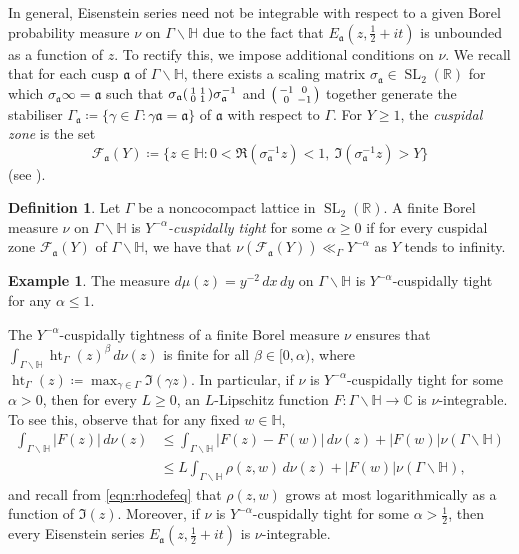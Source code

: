 \documentclass[11pt,a4paper]{amsart}
\newcommand{\af}{\mathfrak{a}}
\newcommand{\C}{\mathbb{C}}
\newcommand{\FF}{\mathcal{F}}
\newcommand{\Hb}{\mathbb{H}}
\newcommand{\R}{\mathbb{R}}
\DeclareMathOperator{\Ht}{ht}
\DeclareMathOperator{\SL}{SL}
\numberwithin{equation}{section}
\theoremstyle{remark}
\theoremstyle{definition}
\newtheorem{definition}[equation]{Definition}
\newtheorem{example}[equation]{Example}
\begin{document}
In general, Eisenstein series need not be integrable with respect to a given Borel probability measure $\nu$ on $\Gamma \backslash \Hb$ due to the fact that $E_{\af}(z,\frac{1}{2} + it)$ is unbounded as a function of $z$. To rectify this, we impose additional conditions on $\nu$. We recall that for each cusp $\af$ of $\Gamma \backslash \Hb$, there exists a scaling matrix $\sigma_{\af} \in \SL_2(\R)$ for which $\sigma_{\af} \infty = \af$ such that $\sigma_{\af} \begin{psmallmatrix} 1 & 1 \\ 0 & 1 \end{psmallmatrix} \sigma_{\af}^{-1}$ and $\begin{psmallmatrix} -1 & 0 \\ 0 & -1 \end{psmallmatrix}$ together generate the stabiliser $\Gamma_{\af} \coloneqq \{\gamma \in \Gamma : \gamma \af = \af\}$ of $\af$ with respect to $\Gamma$. For $Y \geq 1$, the \emph{cuspidal zone} is the set
\[\FF_{\af}(Y) \coloneqq \{z \in \Hb : 0 < \Re(\sigma_{\af}^{-1} z) < 1, \ \Im(\sigma_{\af}^{-1} z) > Y\}\]
(see \cite[Section 2.2]{Iwa02}).

\begin{definition}
Let $\Gamma$ be a noncocompact lattice in $\SL_2(\R)$. A finite Borel measure $\nu$ on $\Gamma \backslash \Hb$ is \emph{$Y^{-\alpha}$-cuspidally tight} for some $\alpha \geq 0$ if for every cuspidal zone $\FF_{\af}(Y)$ of $\Gamma \backslash \Hb$, we have that $\nu(\FF_{\af}(Y)) \ll_{\Gamma} Y^{-\alpha}$ as $Y$ tends to infinity.
\end{definition}

\begin{example}
The measure $d\mu(z) = y^{-2} \, dx \, dy$ on $\Gamma \backslash \Hb$ is $Y^{-\alpha}$-cuspidally tight for any $\alpha \leq 1$.
\end{example}

The $Y^{-\alpha}$-cuspidally tightness of a finite Borel measure $\nu$ ensures that $\int_{\Gamma \backslash \Hb} \Ht_{\Gamma}(z)^{\beta} \, d\nu(z)$ is finite for all $\beta \in [0,\alpha)$, where $\Ht_{\Gamma}(z) \coloneqq \max_{\gamma \in \Gamma} \Im(\gamma z)$. In particular, if $\nu$ is $Y^{-\alpha}$-cuspidally tight for some $\alpha > 0$, then for every $L \geq 0 $, an $L$-Lipschitz function $F : \Gamma \backslash \Hb \to \C$ is $\nu$-integrable. To see this, observe that for any fixed $w \in \Hb$,
\begin{align*}
\int_{\Gamma \backslash \Hb} |F(z)| \, d\nu(z) & \leq \int_{\Gamma \backslash \Hb} |F(z) - F(w)| \, d\nu(z) + |F(w)| \nu(\Gamma \backslash \Hb)	\\
& \leq L \int_{\Gamma \backslash \Hb} \rho(z,w) \, d\nu(z) + |F(w)| \nu(\Gamma \backslash \Hb),
\end{align*}
and recall from \eqref{eqn:rhodefeq} that $\rho(z,w)$ grows at most logarithmically as a function of $\Im(z)$. Moreover, if $\nu$ is $Y^{-\alpha}$-cuspidally tight for some $\alpha > \frac{1}{2}$, then every Eisenstein series $E_{\af}(z,\frac{1}{2} + it)$ is $\nu$-integrable.
\end{document}

